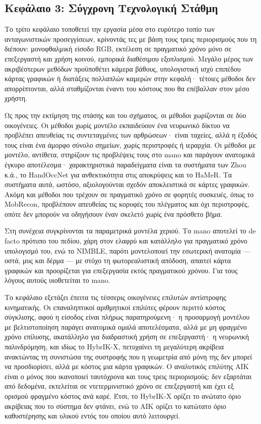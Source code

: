 \subsection*{Κεφάλαιο 3: Σύγχρονη Τεχνολογική Στάθμη}

Το τρίτο κεφάλαιο τοποθετεί την εργασία μέσα στο ευρύτερο τοπίο των
ανταγωνιστικών προσεγγίσεων, κρίνοντάς τες με βάση τους τρεις περιορισμούς που
τη διέπουν: μονοφθαλμική είσοδο RGB, εκτέλεση σε πραγματικό χρόνο μόνο σε
επεξεργαστή και χρήση κοινού, εμπορικά διαθέσιμου εξοπλισμού. Μεγάλο μέρος των
ακριβέστερων μεθόδων προϋποθέτει κάμερα βάθους, υπολογιστική ισχύ επιπέδου
κάρτας γραφικών ή διατάξεις πολλαπλών καμερών στην κεφαλή· τέτοιες μέθοδοι δεν
απορρίπτονται, αλλά σταθμίζονται έναντι του κόστους που θα επέβαλλαν στον μέσο
χρήστη.

Ως προς την εκτίμηση της στάσης και του σχήματος, οι μέθοδοι χωρίζονται σε δύο
οικογένειες. Οι μέθοδοι χωρίς μοντέλο εκπαιδεύουν ένα νευρωνικό δίκτυο να
προβλέπει απευθείας τις συντεταγμένες των αρθρώσεων· είναι ταχείες, αλλά η
έξοδός τους είναι ένα άμορφο σύνολο σημείων, χωρίς περιστροφές ή ιεραρχία. Οι
μέθοδοι με μοντέλο, αντίθετα, στηρίζουν τις προβλέψεις τους στο \acrshort{mano}
και παράγουν ανατομικά έγκυρο αποτέλεσμα· χαρακτηριστικά παραδείγματα είναι τα
συστήματα των Zhou κ.ά., το HandOccNet για ανθεκτικότητα στις αποκρύψεις και
το HaMeR. Τα συστήματα αυτά, ωστόσο, αξιολογούνται σχεδόν αποκλειστικά σε
κάρτες γραφικών. Ακόμη και μέθοδοι που τρέχουν σε πραγματικό χρόνο σε φορητές
συσκευές, όπως το MobRecon, προβλέπουν απευθείας τις κορυφές του πλέγματος και
όχι περιστροφές, οπότε δεν μπορούν να οδηγήσουν έναν σκελετό χωρίς ένα πρόσθετο
βήμα.

Στη συνέχεια συγκρίνονται τα παραμετρικά μοντέλα χεριού. Το \acrshort{mano}
αποτελεί το de facto πρότυπο του πεδίου, χάρη στον ελαφρύ και κατάλληλο για
πραγματικό χρόνο υπολογισμό του, ενώ το NIMBLE, παρότι μοντελοποιεί την
εσωτερική ανατομία --- οστά, μυς και δέρμα --- με στόχο τη φωτορεαλιστική
απόδοση, απαιτεί κάρτα γραφικών και προορίζεται για επεξεργασία εκτός
πραγματικού χρόνου. Για τους λόγους αυτούς υιοθετείται το \acrshort{mano}.

Το κεφάλαιο εξετάζει έπειτα τις τέσσερις οικογένειες επιλυτών αντίστροφης
κινηματικής. Οι επαναληπτικοί αριθμητικοί επιλύτες φέρουν περιττό κόστος
σύγκλισης, αφού η είσοδος είναι πλήρως παρατηρούμενη· η προσαρμογή μοντέλου με
βελτιστοποίηση παράγει ανατομικά ομαλά αποτελέσματα, αλλά με μη φραγμένο χρόνο
επίλυσης, ακατάλληλο για διαδραστική χρήση σε επεξεργαστή· η νευρωνική
παλινδρόμηση, και ιδίως το HybrIK-X, πετυχαίνει τη μεγαλύτερη ακρίβεια
ανακτώντας τη συνιστώσα της συστροφής που η γεωμετρία από μόνη της δεν μπορεί
να προσδιορίσει, αλλά με κόστος μια κάρτα γραφικών. Ο αναλυτικός επιλύτης AIK
είναι ο μόνος που ικανοποιεί ταυτόχρονα και τους τρεις περιορισμούς: δεν
εξαρτάται από δεδομένα, εκτελείται σε ντετερμινιστικό χρόνο σε επεξεργαστή και
έχει εξ ορισμού φραγμένο κόστος ανά καρέ. Έτσι, το HybrIK-X ορίζει το ανώτατο
όριο ακρίβειας που το σύστημα δεν φτάνει, ενώ το AIK ορίζει το κατώτατο όριο
καθυστέρησης και υλικού εντός του οποίου αυτό λειτουργεί.

